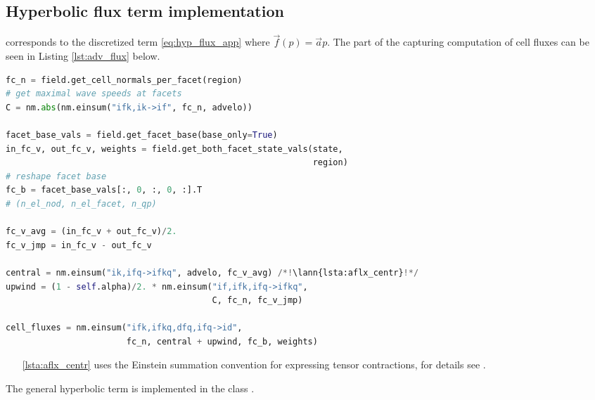 \subsection{Hyperbolic flux term implementation}
\label{se:adv_flux_term_imp}
 corresponds to the discretized term \eqref{eq:hyp_flux_app}
where $\vec{f}(p) = \vec{a}p$. The part of the  capturing computation of
cell fluxes can be seen in Listing \ref{lst:adv_flux} below.
\setcounter{lstannotation}{0}
\begin{lstlisting}[language=Python, caption=Computation of advection cell
fluxes \label{lst:adv_flux}]
fc_n = field.get_cell_normals_per_facet(region)
# get maximal wave speeds at facets
C = nm.abs(nm.einsum("ifk,ik->if", fc_n, advelo))

facet_base_vals = field.get_facet_base(base_only=True)
in_fc_v, out_fc_v, weights = field.get_both_facet_state_vals(state,
                                                             region)
# reshape facet base
fc_b = facet_base_vals[:, 0, :, 0, :].T
# (n_el_nod, n_el_facet, n_qp)

fc_v_avg = (in_fc_v + out_fc_v)/2.
fc_v_jmp = in_fc_v - out_fc_v

central = nm.einsum("ik,ifq->ifkq", advelo, fc_v_avg) /*!\lann{lsta:aflx_centr}!*/
upwind = (1 - self.alpha)/2. * nm.einsum("if,ifk,ifq->ifkq",
                                         C, fc_n, fc_v_jmp)

cell_fluxes = nm.einsum("ifk,ifkq,dfq,ifq->id",
                        fc_n, central + upwind, fc_b, weights)
\end{lstlisting}
\begin{itemize}
    \item[\ref{lsta:aflx_centr}]  uses the Einstein summation convention for
    expressing tensor contractions, for details see \cite{einsum-doc}.
\end{itemize}
The general hyperbolic term is implemented in the class
.



